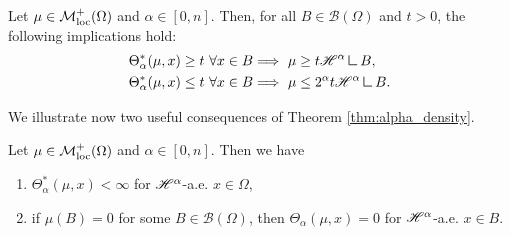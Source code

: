 \begin{theorem} \label{thm:alpha_density}
Let $\mu \in \mathcal{M}^{+}_{\rm loc}(\Omega)$ and $\alpha \in [0, n]$. Then, for all $B \in \mathcal{B}(\Omega)$ and $t > 0$, the following implications hold:
\begin{align}
\Theta^{*}_{\alpha}(\mu, x) \ge t \ \forall x \in B & \Longrightarrow \ \mu \ge t \Haus{\alpha} \res B, \label{eq:lower_bound_density} \\
\Theta^{*}_{\alpha}(\mu, x) \le t \ \forall x \in B & \Longrightarrow \ \mu \le 2^{\alpha} t \Haus{\alpha} \res B. \label{eq:upper_bound_density}
\end{align}
\end{theorem}

We illustrate now two useful consequences of Theorem \ref{thm:alpha_density}.

%
%
\begin{corollary}
Let $\mu \in \mathcal{M}^{+}_{\rm loc}(\Omega)$ and $\alpha \in [0, n]$. Then we have
\begin{enumerate}
\item $\Theta^{*}_{\alpha}(\mu, x) < \infty$ for $\mathscr{H}^{\alpha}$-a.e. $x \in \Omega$,
\item if $\mu(B) = 0$ for some $B \in \mathcal{B}(\Omega)$, then $\Theta_{\alpha}(\mu, x) = 0$ for $\mathscr{H}^{\alpha}$-a.e. $x \in B$.
\end{enumerate}
\end{corollary}

